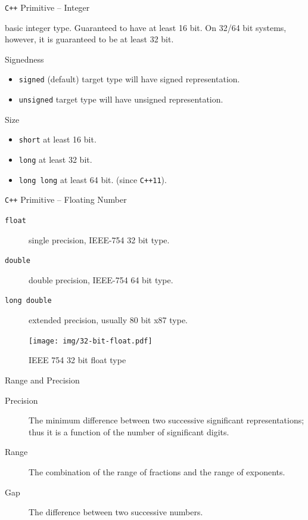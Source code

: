 \documentclass[presentation]{beamer}
\begin{document}
\begin{frame}[fragile,label={sec:orgheadline6}]{\texttt{C++} Primitive -- Integer}
 \begin{description}
\item[{\texttt{int}}] basic integer type.  Guaranteed to have at least 16 bit.
On 32/64 bit systems, however, it is guaranteed to be at least
32 bit.

\item Signedness
\begin{itemize}
\item \texttt{signed} (default) target type will have signed representation.
\item \texttt{unsigned} target type will have unsigned representation.
\end{itemize}

\item Size
\begin{itemize}
\item \texttt{short} at least 16 bit.
\item \texttt{long} at least 32 bit.
\item \texttt{long long} at least 64 bit. (since \texttt{C++11}).
\end{itemize}
\end{description}
\end{frame}

\begin{frame}[fragile,label={sec:orgheadline7}]{\texttt{C++} Primitive -- Floating Number}
 \begin{description}
\item[{\texttt{float}}] single precision, IEEE-754 32 bit type.
\item[{\texttt{double}}] double precision, IEEE-754 64 bit type.
\item[{\texttt{long double}}] extended precision, usually 80 bit x87 type.
\end{description}

\begin{figure}[htb]
\centering
\texttt{[image: img/32-bit-float.pdf]}
\caption{IEEE 754 32 bit float type}
\end{figure}
\end{frame}

\begin{frame}[label={sec:orgheadline8}]{Range and Precision}
\begin{description}
\item[{Precision}] The minimum difference between two successive
significant representations; thus it is a function of the
number of significant digits.
\item[{Range}] The combination of the range of fractions and the range
of exponents.
\item[{Gap}] The difference between two successive numbers.
\end{description}
\end{frame}
\end{document}
